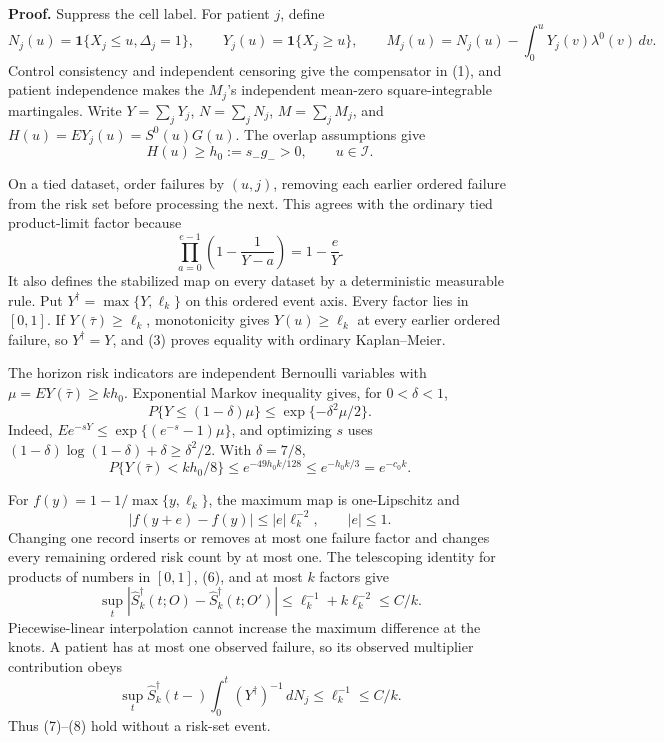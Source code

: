 \textbf{Proof.}
Suppress the cell label. For patient \(j\), define
\[
 N_j(u)=\mathbf 1\{X_j\le u,\Delta_j=1\},\qquad
 Y_j(u)=\mathbf 1\{X_j\ge u\},\qquad
 M_j(u)=N_j(u)-\int_0^uY_j(v)\lambda^0(v)\,dv.             \tag{1}
\]
Control consistency and independent censoring give the compensator in (1), and patient independence makes the \(M_j\)'s independent mean-zero square-integrable martingales. Write \(Y=\sum_jY_j\), \(N=\sum_jN_j\), \(M=\sum_jM_j\), and \(H(u)=EY_j(u)=S^0(u)G(u)\). The overlap assumptions give
\[
 H(u)\ge h_0:=s_-g_->0,\qquad u\in\mathcal I.             \tag{2}
\]

On a tied dataset, order failures by \((u,j)\), removing each earlier ordered failure from the risk set before processing the next. This agrees with the ordinary tied product-limit factor because
\[
 \prod_{a=0}^{e-1}\left(1-\frac1{Y-a}\right)=1-\frac eY. \tag{3}
\]
It also defines the stabilized map on every dataset by a deterministic measurable rule. Put \(Y^\dagger=\max\{Y,\ell_k\}\) on this ordered event axis. Every factor lies in \([0,1]\). If \(Y(\bar\tau)\ge\ell_k\), monotonicity gives \(Y(u)\ge\ell_k\) at every earlier ordered failure, so \(Y^\dagger=Y\), and (3) proves equality with ordinary Kaplan--Meier.

The horizon risk indicators are independent Bernoulli variables with \(\mu=EY(\bar\tau)\ge kh_0\). Exponential Markov inequality gives, for \(0<\delta<1\),
\[
 P\{Y\le(1-\delta)\mu\}\le\exp\{-\delta^2\mu/2\}.       \tag{4}
\]
Indeed, \(Ee^{-sY}\le\exp\{(e^{-s}-1)\mu\}\), and optimizing \(s\) uses \((1-\delta)\log(1-\delta)+\delta\ge\delta^2/2\). With \(\delta=7/8\),
\[
 P\{Y(\bar\tau)<kh_0/8\}
 \le e^{-49h_0k/128}\le e^{-h_0k/3}=e^{-c_0k}.           \tag{5}
\]

For \(f(y)=1-1/\max\{y,\ell_k\}\), the maximum map is one-Lipschitz and
\[
 |f(y+e)-f(y)|\le |e|\ell_k^{-2},\qquad |e|\le1.          \tag{6}
\]
Changing one record inserts or removes at most one failure factor and changes every remaining ordered risk count by at most one. The telescoping identity for products of numbers in \([0,1]\), (6), and at most \(k\) factors give
\[
 \sup_t|\widehat S_k^\dagger(t;O)-\widehat S_k^\dagger(t;O')|
 \le \ell_k^{-1}+k\ell_k^{-2}\le C/k.                  \tag{7}
\]
Piecewise-linear interpolation cannot increase the maximum difference at the knots. A patient has at most one observed failure, so its observed multiplier contribution obeys
\[
 \sup_t\widehat S_k^\dagger(t-)
 \int_0^t(Y^\dagger)^{-1}\,dN_j
 \le\ell_k^{-1}\le C/k.                                 \tag{8}
\]
Thus (7)--(8) hold without a risk-set event.

